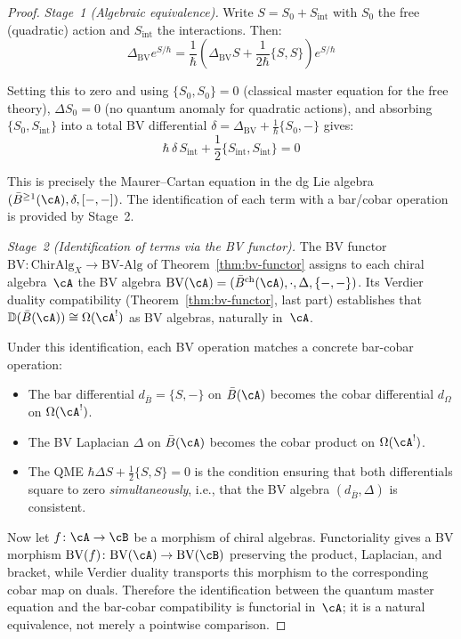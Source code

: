 \begin{proof}
\emph{Stage~1 (Algebraic equivalence).}
Write $S = S_0 + S_{\text{int}}$ with $S_0$ the free (quadratic) action and $S_{\text{int}}$ the interactions.  Then:
\[\Delta_{\text{BV}} e^{S/\hbar} = \frac{1}{\hbar}\left(\Delta_{\text{BV}} S +
\frac{1}{2\hbar}\{S, S\}\right) e^{S/\hbar}\]

Setting this to zero and using $\{S_0, S_0\} = 0$ (classical master equation for the free theory), $\Delta S_0 = 0$ (no quantum anomaly for quadratic actions), and absorbing $\{S_0, S_{\text{int}}\}$ into a total BV differential $\delta = \Delta_{\text{BV}} + \frac{1}{\hbar}\{S_0, -\}$ gives:
\[\hbar\,\delta\, S_{\text{int}} + \frac{1}{2}\{S_{\text{int}}, S_{\text{int}}\} = 0\]

This is precisely the Maurer--Cartan equation in the dg Lie algebra
$(\bar{B}^{\ge 1}(\cA), \delta, [-,-])$.  The identification of each
term with a bar/cobar operation is provided by Stage~2.

\emph{Stage~2 (Identification of terms via the BV functor).}
The BV functor $\mathrm{BV}: \mathrm{ChirAlg}_X \to \mathrm{BV\text{-}Alg}$
of Theorem~\ref{thm:bv-functor} assigns to each chiral algebra~$\cA$ the BV algebra
$\mathrm{BV}(\cA) = (\bar{B}^{\mathrm{ch}}(\cA), \cdot, \Delta, \{-,-\})$.
Its Verdier duality compatibility (Theorem~\ref{thm:bv-functor}, last part)
establishes that $\mathbb{D}(\bar{B}(\cA)) \cong \Omega(\cA^!)$ as BV algebras,
naturally in~$\cA$.

Under this identification, each BV operation matches a concrete
bar-cobar operation:
\begin{itemize}
\item The bar differential $d_{\bar{B}} = \{S, -\}$ on $\bar{B}(\cA)$ becomes
the cobar differential $d_\Omega$ on $\Omega(\cA^!)$.
\item The BV Laplacian $\Delta$ on $\bar{B}(\cA)$ becomes the cobar product on $\Omega(\cA^!)$.
\item The QME $\hbar\Delta S + \tfrac{1}{2}\{S,S\} = 0$ is the condition ensuring
that both differentials square to zero \emph{simultaneously}, i.e.,
that the BV algebra $(d_{\bar{B}}, \Delta)$ is consistent.
\end{itemize}

Now let $f\colon \cA \to \cB$ be a morphism of chiral algebras.
Functoriality gives a BV morphism
$\mathrm{BV}(f)\colon \mathrm{BV}(\cA) \to \mathrm{BV}(\cB)$
preserving the product, Laplacian, and bracket, while Verdier
duality transports this morphism to the corresponding cobar map on
duals.  Therefore the identification between the quantum master
equation and the bar-cobar compatibility is functorial in~$\cA$; it is
a natural equivalence, not merely a pointwise comparison.
\end{proof}


